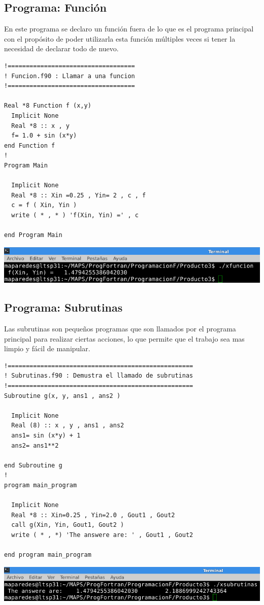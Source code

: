 \documentclass[12pt]{article}
\begin{document}
\subsection{Programa: Función}
En este programa se declaro un función fuera de lo que es el programa principal con el propósito de poder utilizarla esta función múltiples veces si tener la necesidad de declarar todo de nuevo.
\begin{verbatim}
!===================================
! Funcion.f90 : Llamar a una funcion
!===================================

Real *8 Function f (x,y)
  Implicit None
  Real *8 :: x , y
  f= 1.0 + sin (x*y)
end Function f
!
Program Main
  
  Implicit None
  Real *8 :: Xin =0.25 , Yin= 2 , c , f 
  c = f ( Xin, Yin )
  write ( * , * ) 'f(Xin, Yin) =' , c

end Program Main

\end{verbatim}
\begin{center}
\includegraphics[width=15cm]{Funcion}
\end{center}
\pagebreak

\subsection{Programa: Subrutinas}
Las subrutinas son pequeños programas que son llamados por el programa principal para realizar ciertas acciones, lo que permite que el trabajo sea mas limpio y fácil de manipular.
\begin{verbatim}
!===================================================
! Subrutinas.f90 : Demustra el llamado de subrutinas
!===================================================
Subroutine g(x, y, ans1 , ans2 )

  Implicit None
  Real (8) :: x , y , ans1 , ans2
  ans1= sin (x*y) + 1
  ans2= ans1**2

end Subroutine g
!
program main_program
  
  Implicit None
  Real *8 :: Xin=0.25 , Yin=2.0 , Gout1 , Gout2
  call g(Xin, Yin, Gout1, Gout2 ) 
  write ( * , *) 'The answere are: ' , Gout1 , Gout2

end program main_program

\end{verbatim}
\begin{center}
\includegraphics[width=15cm]{Subrutinas}
\end{center}
\end{document}
